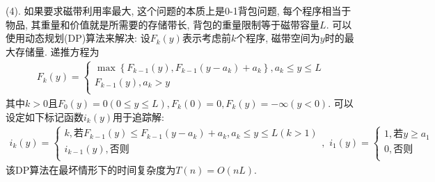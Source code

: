 \documentclass{article}
\begin{document}
\begin{homeworkProblem}
	(4). 如果要求磁带利用率最大, 这个问题的本质上是0-1背包问题, 每个程序相当于物品, 其重量和价值就是所需要的存储带长, 背包的重量限制等于磁带容量$L$. 可以使用动态规划(DP)算法来解决: 设$F_k\left( y \right) $表示考虑前$k$个程序, 磁带空间为$y$时的最大存储量. 递推方程为
	\begin{align}
		F_k\left( y \right) =\begin{cases}
			\max \left\{ F_{k-1}\left( y \right) ,F_{k-1}\left( y-a_k \right) +a_k \right\} , a_k\le y\le L\\
			F_{k-1}\left( y \right) , a_k>y\\
		\end{cases}
	\end{align}
	其中$k>0$且$F_0\left( y \right) =0 \left( 0\le y\le L \right) , F_k\left( 0 \right) =0, F_k\left( y \right) =-\infty \left( y<0 \right)$. 可以设定如下标记函数$i_k(y)$用于追踪解:
	\begin{align}
		i_k\left( y \right) =\begin{cases}
			k, \text{若}F_{k-1}\left( y \right) \le F_{k-1}\left( y-a_k \right) +a_k,a_k\le y\le L\left( k>1 \right)\\
			i_{k-1}\left( y \right) , \text{否则}\\
		\end{cases},\,\, i_1\left( y \right) =\begin{cases}
			1, \text{若}y\ge a_1\\
			0, \text{否则}\\
		\end{cases}
	\end{align}
	该DP算法在最坏情形下的时间复杂度为$T(n)=O(nL)$.
\end{homeworkProblem}



\pagebreak
\end{document}
